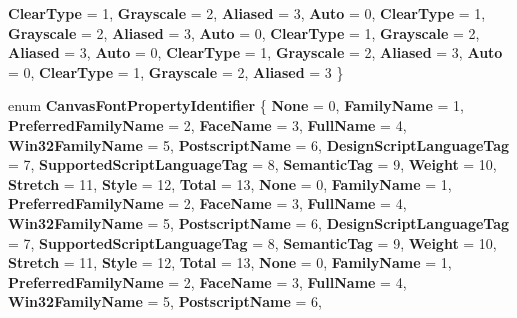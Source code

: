 \begin{DoxyCompactItemize}
{\bfseries Clear\+Type} = 1, 
{\bfseries Grayscale} = 2, 
{\bfseries Aliased} = 3, 
\newline
{\bfseries Auto} = 0, 
{\bfseries Clear\+Type} = 1, 
{\bfseries Grayscale} = 2, 
{\bfseries Aliased} = 3, 
\newline
{\bfseries Auto} = 0, 
{\bfseries Clear\+Type} = 1, 
{\bfseries Grayscale} = 2, 
{\bfseries Aliased} = 3, 
\newline
{\bfseries Auto} = 0, 
{\bfseries Clear\+Type} = 1, 
{\bfseries Grayscale} = 2, 
{\bfseries Aliased} = 3, 
\newline
{\bfseries Auto} = 0, 
{\bfseries Clear\+Type} = 1, 
{\bfseries Grayscale} = 2, 
{\bfseries Aliased} = 3
 \}
\item 
\mbox{\label{namespace_microsoft_1_1_graphics_1_1_canvas_1_1_text_a79bca70c038ce3691b2e0c4ded541979}} 
enum {\bfseries Canvas\+Font\+Property\+Identifier} \{ \newline
{\bfseries None} = 0, 
{\bfseries Family\+Name} = 1, 
{\bfseries Preferred\+Family\+Name} = 2, 
{\bfseries Face\+Name} = 3, 
\newline
{\bfseries Full\+Name} = 4, 
{\bfseries Win32\+Family\+Name} = 5, 
{\bfseries Postscript\+Name} = 6, 
{\bfseries Design\+Script\+Language\+Tag} = 7, 
\newline
{\bfseries Supported\+Script\+Language\+Tag} = 8, 
{\bfseries Semantic\+Tag} = 9, 
{\bfseries Weight} = 10, 
{\bfseries Stretch} = 11, 
\newline
{\bfseries Style} = 12, 
{\bfseries Total} = 13, 
{\bfseries None} = 0, 
{\bfseries Family\+Name} = 1, 
\newline
{\bfseries Preferred\+Family\+Name} = 2, 
{\bfseries Face\+Name} = 3, 
{\bfseries Full\+Name} = 4, 
{\bfseries Win32\+Family\+Name} = 5, 
\newline
{\bfseries Postscript\+Name} = 6, 
{\bfseries Design\+Script\+Language\+Tag} = 7, 
{\bfseries Supported\+Script\+Language\+Tag} = 8, 
{\bfseries Semantic\+Tag} = 9, 
\newline
{\bfseries Weight} = 10, 
{\bfseries Stretch} = 11, 
{\bfseries Style} = 12, 
{\bfseries Total} = 13, 
\newline
{\bfseries None} = 0, 
{\bfseries Family\+Name} = 1, 
{\bfseries Preferred\+Family\+Name} = 2, 
{\bfseries Face\+Name} = 3, 
\newline
{\bfseries Full\+Name} = 4, 
{\bfseries Win32\+Family\+Name} = 5, 
{\bfseries Postscript\+Name} = 6, 

\end{DoxyCompactItemize}
